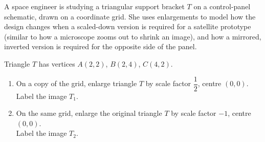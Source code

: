 \begin{question}
\noindent A space engineer is studying a triangular support bracket $T$ on a control-panel schematic, drawn on a coordinate grid. She uses enlargements to model how the design changes when a scaled-down version is required for a satellite prototype (similar to how a microscope zooms out to shrink an image), and how a mirrored, inverted version is required for the opposite side of the panel.

\begin{center}
\end{center}

\noindent Triangle $T$ has vertices $A(2,2)$, $B(2,4)$, $C(4,2)$.

\begin{enumerate}
    \item[(a)] On a copy of the grid, enlarge triangle $T$ by scale factor $\dfrac{1}{2}$, centre $(0,0)$.\\
    Label the image $T_1$.

    \vspace{4cm}

    \item[(b)] On the same grid, enlarge the original triangle $T$ by scale factor $-1$, centre $(0,0)$.\\
    Label the image $T_2$.

    \vspace{4cm}
\end{enumerate}
\end{question}

